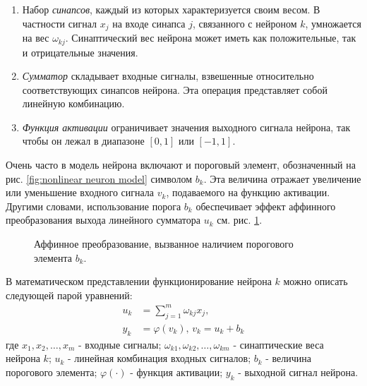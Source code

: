 \documentclass[a4paper,12pt]{report}
\begin{document}
\begin{enumerate}
    \item Набор \textit{синапсов}, каждый из которых характеризуется своим
        весом. В частности сигнал $x_j$ на входе синапса $j$,
        связанного с нейроном $k$, умножается на вес $\omega_{kj}$.
        Синаптический вес нейрона может иметь как положительные, так и
        отрицательные значения.
    \item \textit{Сумматор} складывает входные сигналы, взвешенные относительно
        соответствующих синапсов нейрона. Эта операция представляет
        собой линейную комбинацию.
    \item \textit{Функция активации} ограничивает значения выходного
        сигнала нейрона, так чтобы он лежал в диапазоне $[0,1]$ или
        $[-1,1]$.
\end{enumerate}

Очень часто в модель нейрона включают и пороговый элемент,
обозначенный на рис. \ref{fig:nonlinear neuron model} символом $b_k$. Эта величина отражает
увеличение или уменьшение входного сигнала $v_k$, подаваемого на функцию
активации. Другими словами, использование порога $b_k$ обеспечивает
эффект аффинного преобразования выхода линейного сумматора $u_k$ см.
рис. \ref{fig:b_k}.

\begin{figure}[!h]
    \centering
    \caption{Аффинное преобразование, вызванное наличием порогового
    элемента $b_k$.} \label{fig:b_k}
\end{figure}

В математическом представлении функционирование нейрона $k$ можно
описать следующей парой уравнений:
\begin{equation}
    \begin{aligned}
        u_k &= \sum^{m}_{j=1}{\omega_{kj}x_j},\\
        y_k &= \varphi(v_k),\, v_k = u_k + b_k
    \end{aligned}
\end{equation}
где $x_1, x_2, \dots, x_m$ - входные сигналы; $\omega_{k1},
\omega_{k2}, \dots, \omega_{km}$ - синаптические веса нейрона $k$;
$u_k$ - линейная комбинация входных сигналов; $b_k$ - величина
порогового элемента; $\varphi(\cdot)$ - функция активации; $y_k$ -
выходной сигнал нейрона.
\end{document}

